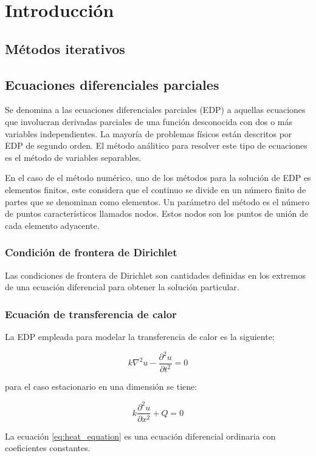 \section{Introducción}

\subsection{Métodos iterativos}

\subsection{Ecuaciones diferenciales parciales}

Se denomina a las ecuaciones diferenciales parciales (EDP) a aquellas ecuaciones que involucran derivadas parciales de una función desconocida con dos o más variables independientes. La mayoría de problemas físicos están descritos por EDP de segundo orden. El método análitico para resolver este tipo de ecuaciones es el método de variables separables.

En el caso de el método numérico, uno de los métodos para la solución de EDP es elementos finitos, este considera que el continuo se divide en un número finito de partes que se denominan como elementos. Un parámetro del método es el número de puntos característicos llamados nodos. Estos nodos son los puntos de unión de cada elemento adyacente\cite{Acosto_2016}.

\subsubsection{Condición de frontera de Dirichlet}

Las condiciones de frontera de Dirichlet son cantidades definidas en los extremos de una ecuación diferencial para obtener la solución particular.

\subsubsection{Ecuación de transferencia de calor}

La EDP empleada para modelar la transferencia de calor es la siguiente:

\begin{equation*}
    k \nabla^2 u - \frac{\partial^2 u}{\partial t^2} = 0
\end{equation*}

para el caso estacionario en una dimensión se tiene:

\begin{equation}
    k\frac{\partial^2 u}{\partial x^2} +Q = 0 \label{eq:heat_equation}
\end{equation}

La ecuación \ref{eq:heat_equation} es una ecuación diferencial ordinaria con coeficientes constantes.

